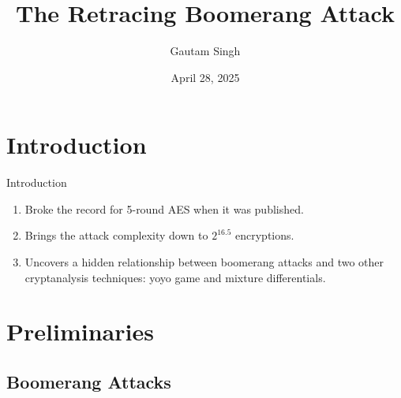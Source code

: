 \documentclass[notheorems]{beamer}
\title{The Retracing Boomerang Attack}
\date{April 28, 2025}
\author{Gautam Singh}
\institute[IITH]{Indian Institute of Technology Hyderabad}
\theoremstyle{definition}
\theoremstyle{example}
\begin{document}
    
    \begin{frame}
        \titlepage
    \end{frame}
    
    \begin{frame}
        \tableofcontents
    \end{frame}
    
    \section{Introduction}
    \label{sec:intro}
    
    \begin{frame}[<+->]{Introduction}
        \begin{enumerate}
            \item Broke the record for 5-round AES when it was
            published.
            \item Brings the attack complexity down to \(2^{16.5}\)
            encryptions.
            \item Uncovers a hidden relationship between boomerang attacks and
            two other cryptanalysis techniques: yoyo game and mixture
            differentials.
        \end{enumerate}
    \end{frame}

    \section{Preliminaries}
    \label{sec:prelims}

    \subsection{Boomerang Attacks}
    \label{subsec:boomerang}
\end{document}
